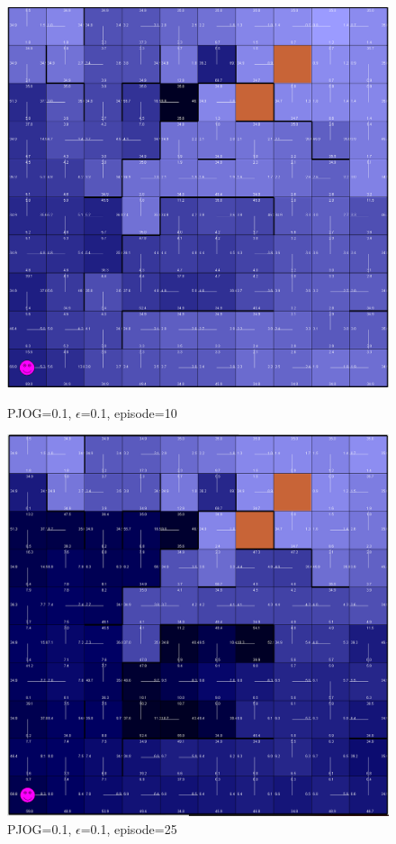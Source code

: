 \documentclass[11pt]{article}
\begin{document}
\begin{figure}[!htb]
   \begin{minipage}{0.34\textwidth}
     \centering
     \includegraphics[width=1.2\linewidth]{../figures/q2_1_10.png}
     \caption{PJOG=0.1, $\epsilon$=0.1, episode=10}\label{Fig:q2_1_10}
   \end{minipage}\hfill
   \begin{minipage}{0.34\textwidth}
     \centering
     \includegraphics[width=1.2\linewidth]{../figures/q2_1_25.png}
     \caption{PJOG=0.1, $\epsilon$=0.1, episode=25}\label{Fig:q2_1_25}
   \end{minipage}
\end{figure}
\end{document}
